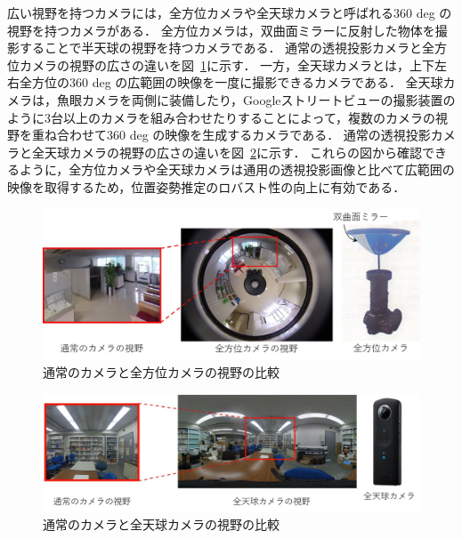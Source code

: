 広い視野を持つカメラには，全方位カメラや全天球カメラと呼ばれる360 deg の視野を持つカメラがある．
全方位カメラは，双曲面ミラーに反射した物体を撮影することで半天球の視野を持つカメラである\mbox{\cite{八木2001}}\mbox{\cite{Panasonic}}\mbox{\cite{ELECOM}}\mbox{\cite{VSTONE}}．
通常の透視投影カメラと全方位カメラの視野の広さの違いを図~\ref{fig:OmniCam}に示す．
一方，全天球カメラとは，上下左右全方位の360 deg の広範囲の映像を一度に撮影できるカメラである\mbox{\cite{RICOH}}\mbox{\cite{Samsung}}\mbox{\cite{LG360}}．
全天球カメラは，魚眼カメラを両側に装備したり，Googleストリートビューの撮影装置のように3台以上のカメラを組み合わせたりすることによって，複数のカメラの視野を重ね合わせて360 deg の映像を生成するカメラである．
通常の透視投影カメラと全天球カメラの視野の広さの違いを図~\ref{fig:SphCam}に示す．
これらの図から確認できるように，全方位カメラや全天球カメラは通用の透視投影画像と比べて広範囲の映像を取得するため，位置姿勢推定のロバスト性の向上に有効である．
\vspace{\baselineskip}

\begin{figure}[b]
 \begin{center}
 \includegraphics[width=0.9\columnwidth]{./chap1/fig/全方位.jpg}
 \caption{通常のカメラと全方位カメラの視野の比較}
 \label{fig:OmniCam}
 \end{center}
 \vspace{5mm}
\end{figure}

\begin{figure}[b]
 \begin{center}
 \includegraphics[width=0.9\columnwidth]{./chap1/fig/全天球.jpg}
 \caption{通常のカメラと全天球カメラの視野の比較}
 \label{fig:SphCam}
 \end{center}
\end{figure}

